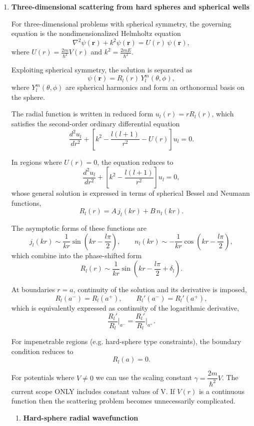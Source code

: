 \documentclass[12pt]{article}
\begin{document}
\begin{enumerate}
\vspace{4pt}

\item \textbf{\large Three-dimensional scattering from hard spheres and spherical wells}

For three-dimensional problems with spherical symmetry, the governing equation is the nondimensionalized Helmholtz equation
\[
\nabla^2 \psi(\mathbf r) + k^2 \psi(\mathbf r) = U(r)\,\psi(\mathbf r),
\]
where \(U(r)=\frac{2m}{\hbar^2}V(r)\) and \(k^2=\frac{2mE}{\hbar^2}\).

Exploiting spherical symmetry, the solution is separated as
\[
\psi(\mathbf r)=R_l(r)\,Y_l^m(\theta,\phi),
\]
where \(Y_l^m(\theta,\phi)\) are spherical harmonics and form an orthonormal basis on the sphere.

The radial function is written in reduced form \(u_l(r)=rR_l(r)\), which satisfies the second-order ordinary differential equation
\[
\frac{d^2 u_l}{dr^2} + \left[k^2 - \frac{l(l+1)}{r^2} - U(r)\right]u_l = 0.
\]

In regions where \(U(r)=0\), the equation reduces to
\[
\frac{d^2 u_l}{dr^2} + \left[k^2 - \frac{l(l+1)}{r^2}\right]u_l = 0,
\]
whose general solution is expressed in terms of spherical Bessel and Neumann functions,
\[
R_l(r)=A\,j_l(kr)+B\,n_l(kr).
\]

The asymptotic forms of these functions are
\[
j_l(kr)\sim \frac{1}{kr}\sin\!\left(kr-\frac{l\pi}{2}\right), \qquad
n_l(kr)\sim -\frac{1}{kr}\cos\!\left(kr-\frac{l\pi}{2}\right),
\]
which combine into the phase-shifted form
\[
R_l(r)\sim \frac{1}{kr}\sin\!\left(kr-\frac{l\pi}{2}+\delta_l\right).
\]

At boundaries \(r=a\), continuity of the solution and its derivative is imposed,
\[
R_l(a^-)=R_l(a^+), \qquad R_l'(a^-)=R_l'(a^+),
\]
which is equivalently expressed as continuity of the logarithmic derivative,
\[
\frac{R_l'}{R_l}\Big|_{a^-}=\frac{R_l'}{R_l}\Big|_{a^+}.
\]

For impenetrable regions (e.g. hard-sphere type constraints), the boundary condition reduces to
\[
R_l(a)=0.
\]

For potentials where $V \neq 0$ we can use the scaling constant $\gamma = \dfrac{2m}{\hbar^2}V$. The current scope ONLY includes constant values of V. If $V(r)$ is a continuous function then the scattering problem becomes unnecessarily complicated.

\begin{enumerate}[label=(\alph*)]
\item \textbf{Hard-sphere radial wavefunction}


\end{enumerate}
\end{enumerate}
\end{document}
